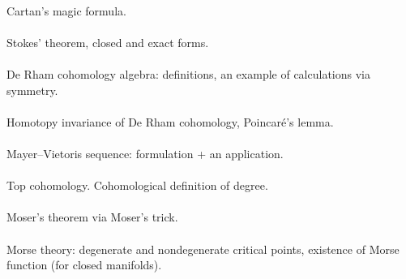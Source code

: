 \documentclass{article}
\begin{document}

\paragraph{} Cartan's magic formula.


\paragraph{} Stokes' theorem, closed and exact forms.


\paragraph{} De Rham cohomology algebra: definitions, an example of calculations via symmetry.


\paragraph{} Homotopy invariance of De Rham cohomology, Poincaré's lemma.


\paragraph{} Mayer--Vietoris sequence: formulation + an application.


\paragraph{}
Top cohomology.
Cohomological definition of degree.


\paragraph{}
Moser's theorem via Moser's trick.


\paragraph{}
Morse theory:
degenerate and nondegenerate critical points,
existence of Morse function (for closed manifolds).

\end{document}
